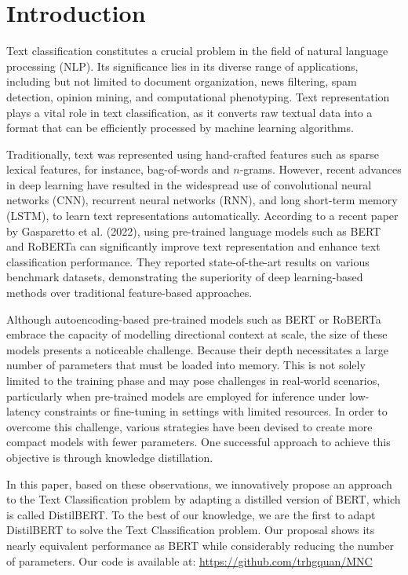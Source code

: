 \documentclass[sn-mathphys,Numbered]{sn-jnl}%
\theoremstyle{thmstyleone}%
\theoremstyle{thmstyletwo}%
\theoremstyle{thmstylethree}%
\begin{document}
\section{Introduction}\label{introduction}
Text classification constitutes a crucial problem in the field of natural language processing (NLP). Its significance lies in its diverse range of applications, including but not limited to document organization, news filtering, spam detection, opinion mining, and computational phenotyping\cite{Aggarwal2012, Zeng2019}. Text representation plays a vital role in text classification, as it converts raw textual data into a format that can be efficiently processed by machine learning algorithms. 

Traditionally, text was represented using hand-crafted features such as sparse lexical features, for instance, bag-of-words and $n$-grams. However, recent advances in deep learning have resulted in the widespread use of convolutional neural networks (CNN)\cite{LeCun1998}, recurrent neural networks (RNN)\cite{Rumelhart1987}, and long short-term memory (LSTM)\cite{Hochreiter1997}, to learn text representations automatically. According to a recent paper by Gasparetto et al. (2022)\cite{Gasparetto2022}, using pre-trained language models such as BERT and RoBERTa can significantly improve text representation and enhance text classification performance. They reported state-of-the-art results on various benchmark datasets, demonstrating the superiority of deep learning-based methods over traditional feature-based approaches.

Although autoencoding-based pre-trained models such as BERT or RoBERTa embrace the capacity of modelling directional context at scale, the size of these models presents a noticeable challenge. Because their depth necessitates a large number of parameters that must be loaded into memory. This is not solely limited to the training phase and may pose challenges in real-world scenarios, particularly when pre-trained models are employed for inference under low-latency constraints or fine-tuning in settings with limited resources. In order to overcome this challenge, various strategies have been devised to create more compact models with fewer parameters. One successful approach to achieve this objective is through knowledge distillation. 

In this paper, based on these observations, we innovatively propose an approach to the Text Classification problem by adapting a distilled version of BERT, which is called DistilBERT. To the best of our knowledge, we are the first to adapt DistilBERT to solve the Text Classification problem. Our proposal shows its nearly equivalent performance as BERT while considerably reducing the number of parameters. Our code is available at: \href{https://github.com/trhgquan/MNC}{https://github.com/trhgquan/MNC}
\end{document}
